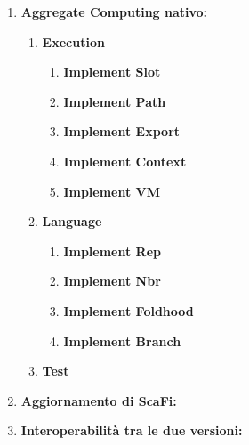 \documentclass[12pt, a4paper]{article}
\begin{document}
\begin{enumerate}
    \item \textbf{Aggregate Computing nativo:}
          \begin{enumerate}
              \item \textbf{Execution}
                    \begin{enumerate}
                        \item \textbf{Implement Slot}
                        \item \textbf{Implement Path}
                        \item \textbf{Implement Export}
                        \item \textbf{Implement Context}
                        \item \textbf{Implement VM}
                    \end{enumerate}

              \item \textbf{Language}
                    \begin{enumerate}
                        \item \textbf{Implement Rep}
                        \item \textbf{Implement Nbr}
                        \item \textbf{Implement Foldhood}
                        \item \textbf{Implement Branch}
                    \end{enumerate}

              \item \textbf{Test}
          \end{enumerate}

    \item \textbf{Aggiornamento di ScaFi:}

    \item \textbf{Interoperabilità tra le due versioni:}
\end{enumerate}
\end{document}
